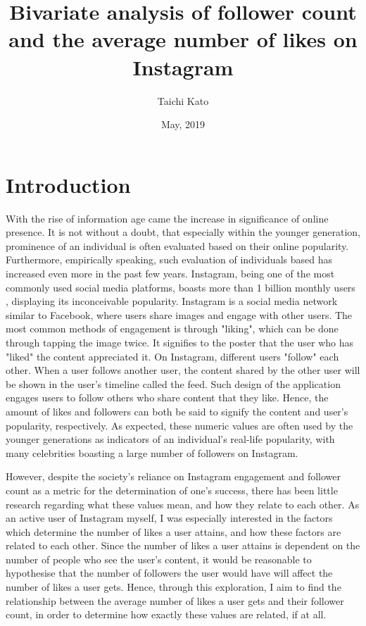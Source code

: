 \documentclass[11pt]{article}
\title{Bivariate analysis of follower count and the average number of likes on Instagram}
\author{Taichi Kato}
\date{May, 2019}
\begin{document}
\maketitle

\begin{abstract}
\textit{
}
\end{abstract}

\section{Introduction}\label{section-introduction}

With the rise of information age came the increase in significance of online presence. 
It is not without a doubt, that especially within the younger generation, prominence of an individual is often evaluated based on their online popularity. 
Furthermore, empirically speaking, such evaluation of individuals based has increased even more in the past few years.
Instagram, being one of the most commonly used social media platforms, boasts more than 1 billion monthly users \cite{techcrunch:online}, displaying its inconceivable popularity.
Instagram is a social media network similar to Facebook, where users share images and engage with other users.
The most common methods of engagement is through "liking", which can be done through tapping the image twice.
It signifies to the poster that the user who has "liked" the content appreciated it.
On Instagram, different users "follow" each other.
When a user follows another user, the content shared by the other user will be shown in the user's timeline called the feed.
Such design of the application engages users to follow others who share content that they like.
Hence, the amount of likes and followers can both be said to signify the content and user's popularity, respectively.
As expected, these numeric values are often used by the younger generations as indicators of an individual's real-life popularity, with many celebrities boasting a large number of followers on Instagram.

However, despite the society's reliance on Instagram engagement and follower count as a metric for the determination of one's success, there has been little research regarding what these values mean, and how they relate to each other.
As an active user of Instagram myself, I was especially interested in the factors which determine the number of likes a user attains, and how these factors are related to each other.
Since the number of likes a user attains is dependent on the number of people who see the user's content, it would be reasonable to hypothesise that the number of followers the user would have will affect the number of likes a user gets. 
Hence, through this exploration, I aim to find the relationship between the average number of likes a user gets and their follower count, in order to determine how exactly these values are related, if at all.
\end{document}

